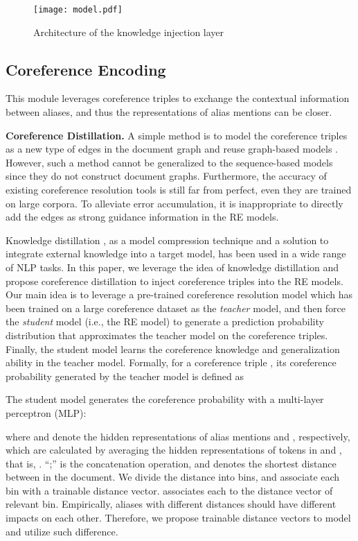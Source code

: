 \documentclass[runningheads]{llncs}
\begin{document}
\begin{figure}[!tb]
	\centering
	\texttt{[image: model.pdf]}
	\caption{Architecture of the knowledge injection layer}
	\label{fig:model}
\end{figure}

\subsection{Coreference Encoding}
This module leverages coreference triples to exchange the contextual information between aliases, and thus the representations of alias mentions can be closer. 

\textbf{Coreference Distillation.}
A simple method is to model the coreference triples as a new type of edges in the document graph and reuse graph-based models \cite{nan2020reasoning,peng2017cross,verga2018simultaneously}.
However, such a method cannot be generalized to the sequence-based models since they do not construct document graphs.
Furthermore, the accuracy of existing coreference resolution tools is still far from perfect, even they are trained on large corpora. 
To alleviate error accumulation, it is inappropriate to directly add the edges as strong guidance information in the RE models.

Knowledge distillation \cite{hinton2015distilling,tong2020improving}, as a model compression technique and a solution to integrate external knowledge into a target model, has been used in a wide range of NLP tasks. 
In this paper, we leverage the idea of knowledge distillation and propose coreference distillation to inject coreference triples into the RE models.
Our main idea is to leverage a pre-trained coreference resolution model which has been trained on a large coreference dataset as the \emph{teacher} model, and then force the \emph{student} model (i.e., the RE model) to generate a prediction probability distribution that approximates the teacher model on the coreference triples.
Finally, the student model learns the coreference knowledge and generalization ability in the teacher model.
Formally, for a coreference triple  , its coreference probability generated by the teacher model is defined as


The student model generates the coreference probability with a multi-layer perceptron (MLP):

where  and  denote the hidden representations of alias mentions  and , respectively, which are calculated by averaging the hidden representations of tokens in  and ,
that is, .
``;'' is the concatenation operation,
and  denotes the shortest distance between  in the document.
We divide the distance into  bins, and associate each bin with a trainable distance vector.
 associates each  to the distance vector of relevant bin. Empirically, aliases with different distances should have different impacts on each other. Therefore, we propose trainable distance vectors to model and utilize such difference.
\end{document}
